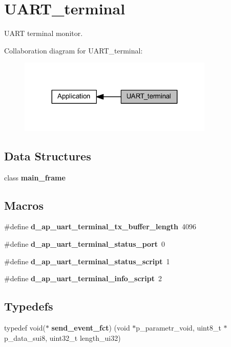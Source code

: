 \section{U\+A\+R\+T\+\_\+terminal}
\label{group___u_a_r_t__terminal}


U\+A\+RT terminal monitor.  


Collaboration diagram for U\+A\+R\+T\+\_\+terminal\+:\nopagebreak
\begin{figure}[H]
\begin{center}
\leavevmode
\includegraphics[width=263pt]{group___u_a_r_t__terminal}
\end{center}
\end{figure}
\subsection*{Data Structures}
\begin{DoxyCompactItemize}
\item 
class \textbf{ main\+\_\+frame}
\end{DoxyCompactItemize}
\subsection*{Macros}
\begin{DoxyCompactItemize}
\item 
\#define \textbf{ d\+\_\+ap\+\_\+uart\+\_\+terminal\+\_\+tx\+\_\+buffer\+\_\+length}~4096
\item 
\mbox{\label{group___u_a_r_t__terminal_ga8ef5406c651e45ccfc2cdc1c87490a8b}} 
\#define {\bfseries d\+\_\+ap\+\_\+uart\+\_\+terminal\+\_\+status\+\_\+port}~0
\item 
\mbox{\label{group___u_a_r_t__terminal_ga5d02361a165f63fdcdb611f9371e07ac}} 
\#define {\bfseries d\+\_\+ap\+\_\+uart\+\_\+terminal\+\_\+status\+\_\+script}~1
\item 
\mbox{\label{group___u_a_r_t__terminal_ga32886d66bfdbab0e9e6f73b63f06b7dd}} 
\#define {\bfseries d\+\_\+ap\+\_\+uart\+\_\+terminal\+\_\+info\+\_\+script}~2
\end{DoxyCompactItemize}
\subsection*{Typedefs}
\begin{DoxyCompactItemize}
\item 
typedef void($\ast$ \textbf{ send\+\_\+event\+\_\+fct}) (void $\ast$p\+\_\+parametr\+\_\+void, uint8\+\_\+t $\ast$p\+\_\+data\+\_\+sui8, uint32\+\_\+t length\+\_\+ui32)
\end{DoxyCompactItemize}
